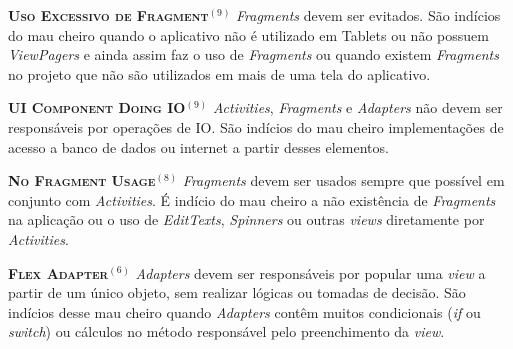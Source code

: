   \noindent
  \textsc{\textbf{{\small Uso Excessivo de Fragment}}}$^{(9)}$ \textit{Fragments} devem ser evitados. São indícios do mau cheiro quando o aplicativo não é utilizado em Tablets ou não possuem \textit{ViewPagers} e ainda assim faz o uso de \textit{Fragments} ou quando existem \textit{Fragments} no projeto que não são utilizados em mais de uma tela do aplicativo.



  \noindent
  \textsc{\textbf{{\small UI Component Doing IO}}}$^{(9)}$
      \textit{Activities}, \textit{Fragments} e \textit{Adapters} não devem ser responsáveis por operações de IO. São indícios do mau cheiro implementações de acesso a banco de dados ou internet a partir desses elementos.



  \noindent
  \textsc{\textbf{{\small No Fragment Usage}}}$^{(8)}$ \textit{Fragments} devem ser usados sempre que possível em conjunto com \textit{Activities}. É indício do mau cheiro a não existência de \textit{Fragments} na aplicação ou o uso de \textit{EditTexts}, \textit{Spinners} ou outras \textit{views} diretamente por \textit{Activities}.



  \noindent
  \textsc{\textbf{{\small Flex Adapter}}}$^{(6)}$ \textit{Adapters} devem ser responsáveis por popular uma \textit{view} a partir de um único objeto, sem realizar lógicas ou tomadas de decisão. São indícios desse mau cheiro quando \textit{Adapters} contêm muitos condicionais (\textit{if} ou \textit{switch}) ou cálculos no método responsável pelo preenchimento da \textit{view}.

